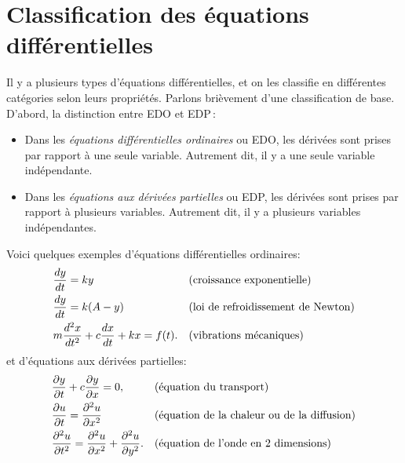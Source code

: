 \sectionnewpage
\section{Classification des \'equations diff\'erentielles}
\label{classification:section}

Il y a plusieurs types d'\'equations diff\'erentielles, et on les classifie en diff\'erentes cat\'egories selon leurs propri\'et\'es.  Parlons bri\`evement d'une classification de base.  D'abord, la distinction entre EDO et EDP\,:
\begin{itemize}
\item
Dans les \emph{\'equations diff\'erentielles ordinaires} ou EDO, les d\'eriv\'ees sont prises par rapport \`a une seule variable.  Autrement dit, il y a une seule variable ind\'ependante.

\item
Dans les \emph{\'equations aux d\'eriv\'ees partielles} ou EDP, les d\'eriv\'ees sont prises par rapport \`a plusieurs variables.  Autrement dit, il y a plusieurs variables ind\'ependantes.
\end{itemize}

Voici quelques exemples d'\'equations diff\'erentielles ordinaires:
\begin{align*}
& \frac{d y}{dt} = ky  & & \text{(croissance exponentielle\index{exponential growth})} \\
& \frac{d y}{dt} = k(A-y)  & & \text{(\myindex{loi de refroidissement de Newton})} \\
& m \frac{d^2 x}{dt^2} + c \frac{dx}{dt} + kx = f(t) . & &
\text{(vibrations m\'ecaniques\index{mechanical vibrations})}
\end{align*}
et d'\'equations aux d\'eriv\'ees partielles:
\begin{align*}
& \frac{\partial y}{\partial t} + c \frac{\partial y}{\partial x} = 0 ,& & 
\text{(\'equation du transport\index{Équation du transport})} \\
& \frac{\partial u}{\partial t} = \frac{\partial^2 u}{\partial x^2}  & & 
\text{(\'equation de la chaleur ou de la diffusion\index{Équation de la chaleur/diffusion})} \\
& \frac{\partial^2 u}{\partial t^2} = \frac{\partial^2 u}{\partial x^2} +
\frac{\partial^2 u}{\partial y^2} . & & 
\text{(\'equation de l'onde en 2 dimensions\index{Équation de l'onde en deux dimensions})}
\end{align*}

